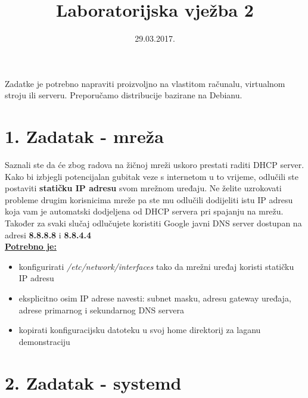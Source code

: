 \documentclass[12pt,a4paper]{article}
\begin{document}
	\title{Laboratorijska vježba 2}
	\date{\vspace{-5ex} 29.03.2017.}
	\maketitle

Zadatke je potrebno napraviti proizvoljno na vlastitom računalu, virtualnom stroju ili serveru. Preporučamo distribucije bazirane na Debianu.

\section*{1. Zadatak - mreža}

Saznali ste da će zbog radova na žičnoj mreži uskoro prestati raditi DHCP server.
Kako bi izbjegli potencijalan gubitak veze s internetom u to vrijeme,
odlučili ste postaviti \textbf{statičku IP adresu} svom mrežnom uređaju.
Ne želite uzrokovati probleme drugim korisnicima mreže pa ste mu odlučili dodijeliti
istu IP adresu koja vam je automatski dodjeljena od DHCP servera pri spajanju na mrežu.
Također za svaki slučaj odlučujete koristiti Google javni DNS server dostupan na adresi \textbf{8.8.8.8} i \textbf{8.8.4.4} \\

\underline{\textbf{Potrebno je:}}
\begin{itemize}
	\item konfigurirati \textit{/etc/network/interfaces} tako da mrežni uređaj koristi statičku IP adresu
  \item eksplicitno osim IP adrese navesti: subnet masku, adresu gateway uređaja, adrese primarnog i sekundarnog DNS servera
  \item kopirati konfiguracijsku datoteku u svoj home direktorij za laganu demonstraciju
\end{itemize}


\newpage


\section*{2. Zadatak - systemd}
\end{document}
